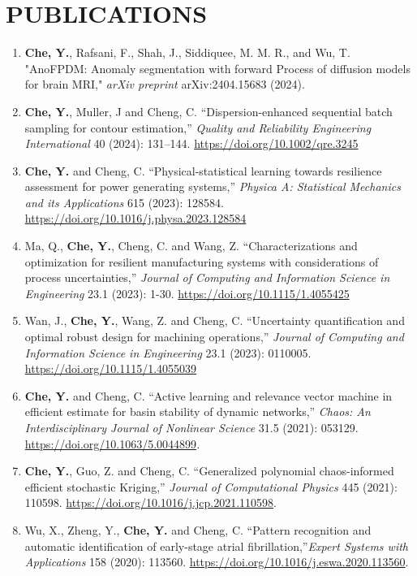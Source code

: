 \documentclass[10pt]{article}
\begin{document}
\section*{PUBLICATIONS}
\begin{enumerate}
	\item {\bf Che, Y.}, Rafsani, F., Shah, J., Siddiquee, M. M. R., and Wu, T. "AnoFPDM: Anomaly segmentation with forward Process of diffusion models for brain MRI," \textit{arXiv preprint} arXiv:2404.15683 (2024).

	\item {\bf Che, Y.}, Muller, J and Cheng, C. ``Dispersion-enhanced sequential batch sampling for contour estimation,'' \textit{Quality and Reliability Engineering International} 40 (2024): 131–144. \url{https://doi.org/10.1002/qre.3245} 

	\item {\bf Che, Y.} and Cheng, C. ``Physical-statistical learning towards resilience assessment for power generating systems,'' \textit{Physica A: Statistical Mechanics and its Applications} 615 (2023): 128584. \url{https://doi.org/10.1016/j.physa.2023.128584}

	\item Ma, Q., {\bf Che, Y.}, Cheng, C. and Wang, Z. ``Characterizations and optimization for resilient manufacturing systems with considerations of process uncertainties,'' \textit{Journal of Computing and Information Science in Engineering} 23.1 (2023): 1-30. \url{ https://doi.org/10.1115/1.4055425}

	\item Wan, J., {\bf Che, Y.}, Wang, Z. and Cheng, C. ``Uncertainty quantification and optimal robust design for machining operations,'' \textit{Journal of Computing and Information Science in Engineering} 23.1 (2023): 0110005. \url{https://doi.org/10.1115/1.4055039}

	\item {\bf Che, Y.} and Cheng, C. ``Active learning and relevance vector machine in efficient estimate for basin stability of dynamic networks,'' \textit{Chaos: An Interdisciplinary Journal of Nonlinear Science} 31.5 (2021): 053129. \url{https://doi.org/10.1063/5.0044899}.

	\item {\bf Che, Y.}, Guo, Z. and Cheng, C. ``Generalized polynomial chaos-informed efficient stochastic Kriging,'' \textit{Journal of Computational Physics} 445 (2021): 110598. \url{https://doi.org/10.1016/j.jcp.2021.110598}.

	\item Wu, X., Zheng, Y., {\bf Che, Y.} and Cheng, C. ``Pattern recognition and automatic identification of early-stage atrial fibrillation,''\textit{Expert Systems with Applications} 158 (2020): 113560. \url{https://doi.org/10.1016/j.eswa.2020.113560}.


\end{enumerate}
\end{document}
